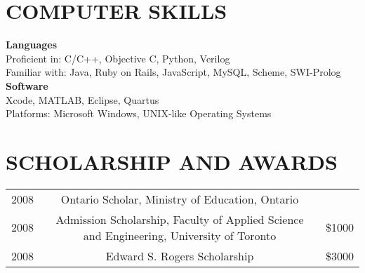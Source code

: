 \documentclass{res}
\begin{document}
\begin{resume}
\section{COMPUTER SKILLS}          
    {\bf Languages}\\Proficient in: C/C++, Objective C, Python, Verilog\\
    Familiar with: Java, Ruby on Rails, JavaScript, MySQL, Scheme, SWI-Prolog\\
    {\bf Software}\\Xcode, MATLAB, Eclipse, Quartus\\
    Platforms: Microsoft Windows\textregistered, UNIX-like Operating Systems
 
\section{SCHOLARSHIP AND AWARDS}          
    \begin{tabular} {l c r}
      2008 & Ontario Scholar, Ministry of Education, Ontario & \\
      2008 & Admission Scholarship, Faculty of Applied Science and Engineering, University of Toronto & \$1000 \\
      2008 & Edward S. Rogers Scholarship & \$3000 \\
    \end{tabular}
 
\end{resume}
\end{document}
